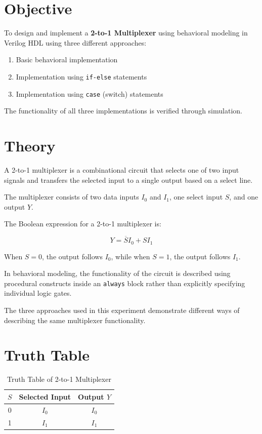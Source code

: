 \documentclass[12pt,a4paper]{report}
\begin{document}
\section{Objective}

To design and implement a \textbf{2-to-1 Multiplexer} using behavioral modeling in Verilog HDL using three different approaches:
\begin{enumerate}
    \item Basic behavioral implementation
    \item Implementation using \texttt{if-else} statements
    \item Implementation using \texttt{case} (switch) statements
\end{enumerate}

The functionality of all three implementations is verified through simulation.

\section{Theory}

A 2-to-1 multiplexer is a combinational circuit that selects one of two input signals and transfers the selected input to a single output based on a select line.

The multiplexer consists of two data inputs $I_0$ and $I_1$, one select input $S$, and one output $Y$.

The Boolean expression for a 2-to-1 multiplexer is:

\[
Y = \overline{S}I_0 + SI_1
\]

When $S=0$, the output follows $I_0$, while when $S=1$, the output follows $I_1$.

In behavioral modeling, the functionality of the circuit is described using procedural constructs inside an \texttt{always} block rather than explicitly specifying individual logic gates.

The three approaches used in this experiment demonstrate different ways of describing the same multiplexer functionality.

\section{Truth Table}

\begin{table}[H]
    \centering
    \caption{Truth Table of 2-to-1 Multiplexer}
    \label{tab:mux2_behavioral}
    \begin{tabular}{|c|c|c|}
    \hline
    \textbf{$S$} & \textbf{Selected Input} & \textbf{Output $Y$} \\
    \hline
    0 & $I_0$ & $I_0$ \\
    \hline
    1 & $I_1$ & $I_1$ \\
    \hline
    \end{tabular}
\end{table}
\end{document}
